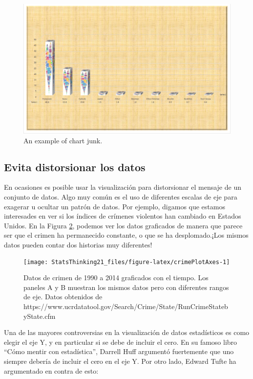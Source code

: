 \documentclass[
  12pt,
]{book}
\begin{document}
\begin{figure}
\includegraphics[width=0.8\linewidth,height=0.5\textheight]{images/excel_chartjunk} \caption{An example of chart junk.}\label{fig:chartJunk}
\end{figure}

\hypertarget{evita-distorsionar-los-datos}{%
\subsection{Evita distorsionar los datos}\label{evita-distorsionar-los-datos}}

En ocasiones es posible usar la visualización para distorsionar el mensaje de un conjunto de datos. Algo muy común es el uso de diferentes escalas de eje para exagerar u ocultar un patrón de datos. Por ejemplo, digamos que estamos interesades en ver si los índices de crímenes violentos han cambiado en Estados Unidos. En la Figura \ref{fig:crimePlotAxes}, podemos ver los datos graficados de manera que parece ser que el crimen ha permanecido constante, o que se ha desplomado.¡Los mismos datos pueden contar dos historias muy diferentes!

\begin{figure}
\texttt{[image: StatsThinking21\_files/figure-latex/crimePlotAxes-1]} \caption{Datos de crimen de 1990 a 2014 graficados con el tiempo. Los paneles A y B muestran los mismos datos pero con diferentes rangos de eje. Datos obtenidos de https://www.ucrdatatool.gov/Search/Crime/State/RunCrimeStatebyState.cfm}\label{fig:crimePlotAxes}
\end{figure}

Una de las mayores controversias en la visualización de datos estadísticos es como elegir el eje Y, y en particular si se debe de incluir el cero. En su famoso libro ``Cómo mentir con estadística'', Darrell Huff argumentó fuertemente que uno siempre debería de incluir el cero en el eje Y. Por otro lado, Edward Tufte ha argumentado en contra de esto:
\end{document}
